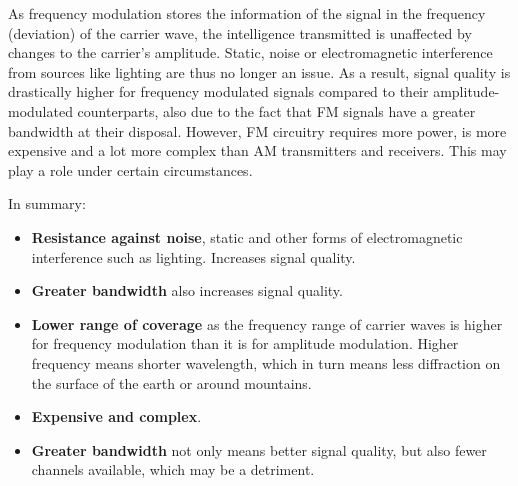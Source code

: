 As frequency modulation stores the information of the signal in the frequency (deviation) of the carrier wave, the intelligence transmitted is unaffected by changes to the carrier's amplitude. Static, noise or electromagnetic interference from sources like lighting are thus no longer an issue. As a result, signal quality is drastically higher for frequency modulated signals compared to their amplitude-modulated counterparts, also due to the fact that FM signals have a greater bandwidth at their disposal. However, FM circuitry requires more power, is more expensive and a lot more complex than AM transmitters and receivers. This may play a role under certain circumstances.

In summary:

\begin{itemize}


	\begin{itemize}

		\item \textbf{Resistance against noise}, static and other forms of electromagnetic interference such as lighting. Increases signal quality.

		\item \textbf{Greater bandwidth} also increases signal quality.

	\end{itemize}


	\begin{itemize}

		\item \textbf{Lower range of coverage} as the frequency range of carrier waves is higher for frequency modulation than it is for amplitude modulation. Higher frequency means shorter wavelength, which in turn means less diffraction on the surface of the earth or around mountains.

		\item \textbf{Expensive and complex}.

		\item \textbf{Greater bandwidth} not only means better signal quality, but also fewer channels available, which may be a detriment.

	\end{itemize}

\end{itemize}


